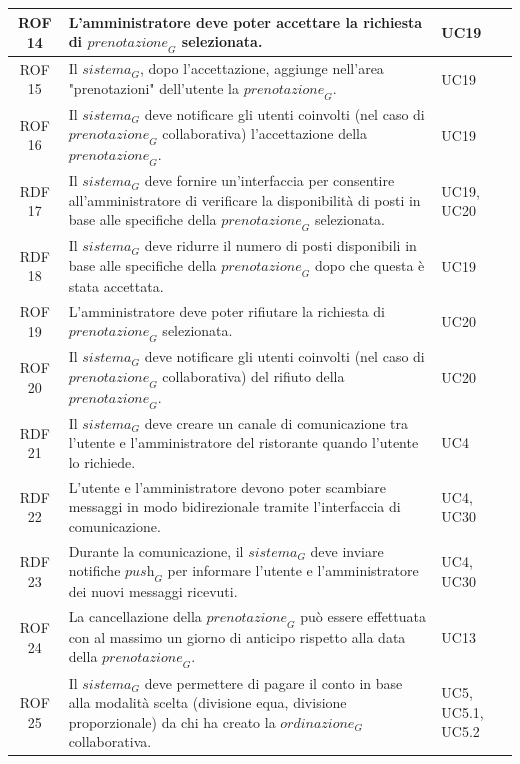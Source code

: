 \documentclass[12pt, oneside]{article}
\begin{document}
\begin{longtable}{|c|p{14cm}|p{2cm}|}
    \hline
    ROF 14& L'amministratore deve poter accettare la richiesta di $\textit{prenotazione}_G$ selezionata. & UC19 \\
    \hline
    ROF 15& Il $\textit{sistema}_G$, dopo l'accettazione, aggiunge nell'area "prenotazioni" dell'utente la $\textit{prenotazione}_G$. & UC19 \\
    \hline
    ROF 16& Il $\textit{sistema}_G$ deve notificare gli utenti coinvolti (nel caso di $\textit{prenotazione}_G$ collaborativa) l'accettazione della $\textit{prenotazione}_G$. & UC19 \\
    \hline
    RDF 17& Il $\textit{sistema}_G$ deve fornire un'interfaccia per consentire all'amministratore di verificare la disponibilità di posti in base alle specifiche della $\textit{prenotazione}_G$ selezionata. & UC19, UC20 \\
    \hline
    RDF 18& Il $\textit{sistema}_G$ deve ridurre il numero di posti disponibili in base alle specifiche della $\textit{prenotazione}_G$ dopo che questa è stata accettata. & UC19 \\
    \hline
    ROF 19& L'amministratore deve poter rifiutare la richiesta di $\textit{prenotazione}_G$ selezionata. & UC20 \\
    \hline
    ROF 20& Il $\textit{sistema}_G$ deve notificare gli utenti coinvolti (nel caso di $\textit{prenotazione}_G$ collaborativa) del rifiuto della $\textit{prenotazione}_G$. & UC20 \\
    \hline
    RDF 21& Il $\textit{sistema}_G$ deve creare un canale di comunicazione tra l'utente e l'amministratore del ristorante quando l'utente lo richiede. & UC4 \\
    \hline
    RDF 22& L'utente e l'amministratore devono poter scambiare messaggi in modo bidirezionale tramite l'interfaccia di comunicazione. & UC4, UC30 \\
    \hline
    RDF 23& Durante la comunicazione, il $\textit{sistema}_G$ deve inviare notifiche $\textit{push}_G$ per informare l'utente e l'amministratore dei nuovi messaggi ricevuti. & UC4, UC30 \\
    \hline
    ROF 24&  La cancellazione della $\textit{prenotazione}_G$ può essere effettuata con al massimo un giorno di anticipo rispetto alla data della $\textit{prenotazione}_G$.  & UC13 \\ 
    \hline
    ROF 25& Il $\textit{sistema}_G$ deve permettere di pagare il conto in base alla modalità scelta (divisione equa, divisione proporzionale) da chi ha creato la $\textit{ordinazione}_G$ collaborativa. & UC5, UC5.1, UC5.2 \\

\end{longtable}
\end{document}
